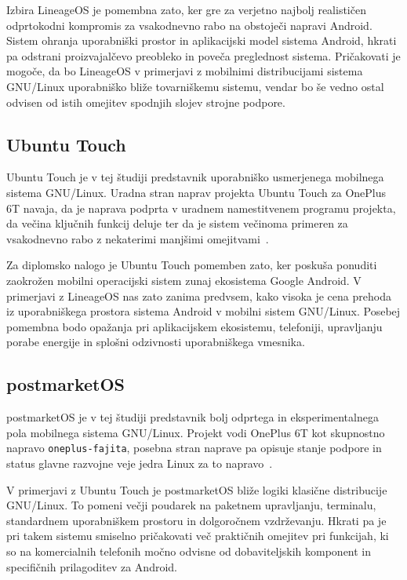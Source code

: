 \documentclass[a4paper,12pt,openright]{book}
\begin{document}
Izbira LineageOS je pomembna zato, ker gre za verjetno najbolj realističen odprtokodni kompromis za vsakodnevno rabo na obstoječi napravi Android.
Sistem ohranja uporabniški prostor in aplikacijski model sistema Android, hkrati pa odstrani proizvajalčevo preobleko in poveča preglednost sistema.
Pričakovati je mogoče, da bo LineageOS v primerjavi z mobilnimi distribucijami sistema GNU/Linux uporabniško bliže tovarniškemu sistemu, vendar bo še vedno ostal odvisen od istih omejitev spodnjih slojev strojne podpore.

\subsection{Ubuntu Touch}
\label{sec:ubuntu_touch_empiricni}

Ubuntu Touch je v tej študiji predstavnik uporabniško usmerjenega mobilnega sistema GNU/Linux.
Uradna stran naprav projekta Ubuntu Touch za OnePlus 6T navaja, da je naprava podprta v uradnem namestitvenem programu projekta, da večina ključnih funkcij deluje ter da je sistem večinoma primeren za vsakodnevno rabo z nekaterimi manjšimi omejitvami~\cite{ubports_fajita}.

Za diplomsko nalogo je Ubuntu Touch pomemben zato, ker poskuša ponuditi zaokrožen mobilni operacijski sistem zunaj ekosistema Google Android.
V primerjavi z LineageOS nas zato zanima predvsem, kako visoka je cena prehoda iz uporabniškega prostora sistema Android v mobilni sistem GNU/Linux.
Posebej pomembna bodo opažanja pri aplikacijskem ekosistemu, telefoniji, upravljanju porabe energije in splošni odzivnosti uporabniškega vmesnika.

\subsection{postmarketOS}
\label{sec:postmarketos_empiricni}

postmarketOS je v tej študiji predstavnik bolj odprtega in eksperimentalnega pola mobilnega sistema GNU/Linux.
Projekt vodi OnePlus 6T kot skupnostno napravo \texttt{oneplus-fajita}, posebna stran naprave pa opisuje stanje podpore in status glavne razvojne veje jedra Linux za to napravo~\cite{postmarketos_fajita,postmarketos_all_devices}.

V primerjavi z Ubuntu Touch je postmarketOS bliže logiki klasične distribucije GNU/Linux.
To pomeni večji poudarek na paketnem upravljanju, terminalu, standardnem uporabniškem prostoru in dolgoročnem vzdrževanju.
Hkrati pa je pri takem sistemu smiselno pričakovati več praktičnih omejitev pri funkcijah, ki so na komercialnih telefonih močno odvisne od dobaviteljskih komponent in specifičnih prilagoditev za Android.
\end{document}
